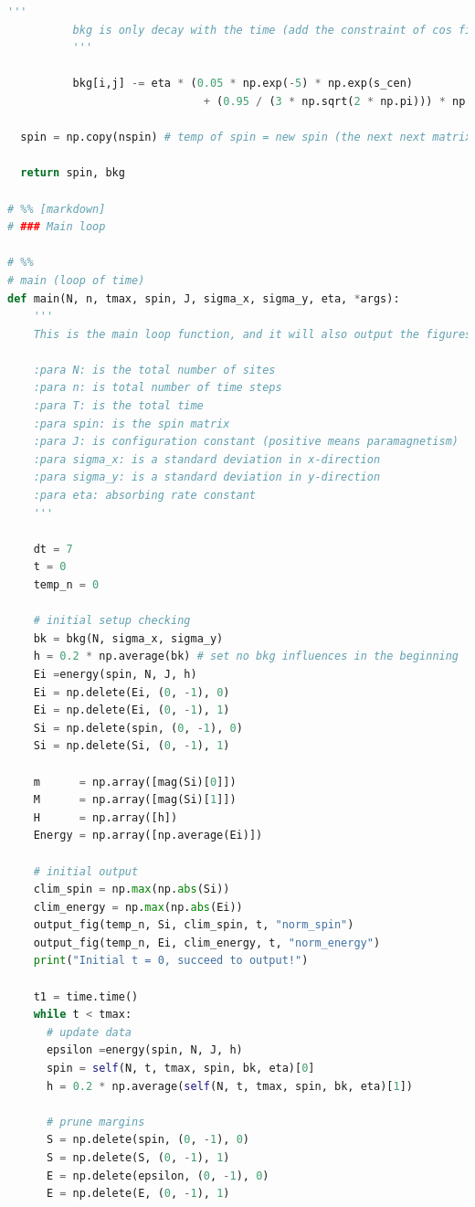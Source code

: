 \documentclass[10pt]{article}
\begin{document}
\begin{lstlisting}[language={Python}]
          '''
          bkg is only decay with the time (add the constraint of cos finction with the period t_max)
          '''

          bkg[i,j] -= eta * (0.05 * np.exp(-5) * np.exp(s_cen) 
                              + (0.95 / (3 * np.sqrt(2 * np.pi))) * np.exp(-np.square(s_cen)/(2 * np.square(3)))) * bkg[i,j] * np.sin(2 * np.pi * t/tmax)

  spin = np.copy(nspin) # temp of spin = new spin (the next next matrix)

  return spin, bkg

# %% [markdown]
# ### Main loop

# %%
# main (loop of time)
def main(N, n, tmax, spin, J, sigma_x, sigma_y, eta, *args):
    '''
    This is the main loop function, and it will also output the figures(.png).

    :para N: is the total number of sites
    :para n: is total number of time steps
    :para T: is the total time
    :para spin: is the spin matrix
    :para J: is configuration constant (positive means paramagnetism)
    :para sigma_x: is a standard deviation in x-direction
    :para sigma_y: is a standard deviation in y-direction
    :para eta: absorbing rate constant
    '''

    dt = 7
    t = 0
    temp_n = 0
    
    # initial setup checking 
    bk = bkg(N, sigma_x, sigma_y)
    h = 0.2 * np.average(bk) # set no bkg influences in the beginning
    Ei =energy(spin, N, J, h)
    Ei = np.delete(Ei, (0, -1), 0)
    Ei = np.delete(Ei, (0, -1), 1)
    Si = np.delete(spin, (0, -1), 0)
    Si = np.delete(Si, (0, -1), 1)
    
    m      = np.array([mag(Si)[0]])
    M      = np.array([mag(Si)[1]])
    H      = np.array([h])
    Energy = np.array([np.average(Ei)])
    
    # initial output
    clim_spin = np.max(np.abs(Si))
    clim_energy = np.max(np.abs(Ei))
    output_fig(temp_n, Si, clim_spin, t, "norm_spin")
    output_fig(temp_n, Ei, clim_energy, t, "norm_energy")
    print("Initial t = 0, succeed to output!")

    t1 = time.time()
    while t < tmax:
      # update data
      epsilon =energy(spin, N, J, h)
      spin = self(N, t, tmax, spin, bk, eta)[0]
      h = 0.2 * np.average(self(N, t, tmax, spin, bk, eta)[1])
      
      # prune margins
      S = np.delete(spin, (0, -1), 0)
      S = np.delete(S, (0, -1), 1)
      E = np.delete(epsilon, (0, -1), 0)
      E = np.delete(E, (0, -1), 1)
      

\end{lstlisting}
\end{document}
